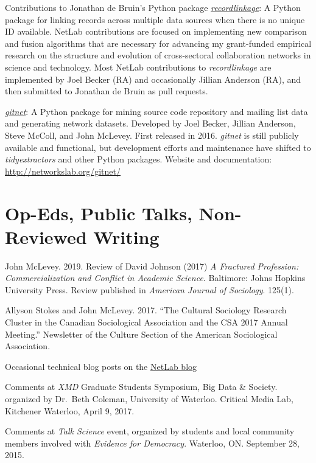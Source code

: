 \ind Contributions to Jonathan de Bruin's Python package
\href{https://github.com/J535D165/recordlinkage}{\emph{recordlinkage}}:
A Python package for linking records across multiple data sources when
there is no unique ID available. NetLab contributions are focused on
implementing new comparison and fusion algorithms that are necessary for
advancing my grant-funded empirical research on the structure and
evolution of cross-sectoral collaboration networks in science and
technology. Most NetLab contributions to \emph{recordlinkage} are
implemented by Joel Becker (RA) and occasionally Jillian Anderson (RA),
and then submitted to Jonathan de Bruin as pull requests.

\ind \href{http://networkslab.org/gitnet/}{\emph{gitnet}}: A Python
package for mining source code repository and mailing list data and
generating network datasets. Developed by Joel Becker, Jillian Anderson,
Steve McColl, and John McLevey. First released in 2016. \emph{gitnet} is
still publicly available and functional, but development efforts and
maintenance have shifted to \emph{tidyextractors} and other Python
packages. Website and documentation:
\url{http://networkslab.org/gitnet/}

\section{Op-Eds, Public Talks, Non-Reviewed
Writing}\label{op-eds-public-talks-non-reviewed-writing}

\ind John McLevey. 2019. Review of David Johnson (2017) \emph{A
Fractured Profession: Commercialization and Conflict in Academic
Science}. Baltimore: Johns Hopkins University Press. Review published in
\emph{American Journal of Sociology}. 125(1).

\ind Allyson Stokes and John McLevey. 2017. ``The Cultural Sociology
Research Cluster in the Canadian Sociological Association and the CSA
2017 Annual Meeting.'' Newsletter of the Culture Section of the American
Sociological Association.

\ind Occasional technical blog posts on the
\href{http://networkslab.org/}{NetLab blog}

\ind Comments at \emph{XMD} Graduate Students Symposium, Big Data \&
Society. organized by Dr.~Beth Coleman, University of Waterloo. Critical
Media Lab, Kitchener Waterloo, April 9, 2017.

\ind Comments at \emph{Talk Science} event, organized by students and
local community members involved with \emph{Evidence for Democracy}.
Waterloo, ON. September 28, 2015.

